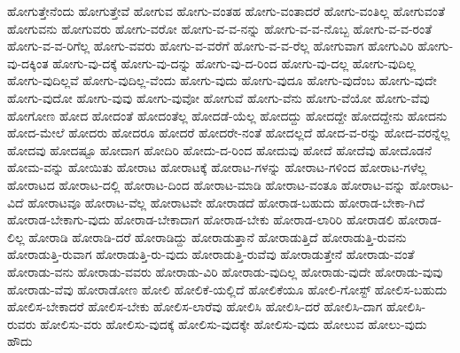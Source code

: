 {ಹೋಗುತ್ತೇನೆಂದು
ಹೋಗುತ್ತೇವೆ
ಹೋಗುವ
ಹೋಗು-ವಂತಹ
ಹೋಗು-ವಂತಾದರೆ
ಹೋಗು-ವಂತಿಲ್ಲ
ಹೋಗುವಂತೆ
ಹೋಗುವನು
ಹೋಗುವರು
ಹೋಗು-ವರೋ
ಹೋಗು-ವ-ವ-ನನ್ನು
ಹೋಗು-ವ-ವ-ನೊಬ್ಬ
ಹೋಗು-ವ-ವ-ರಂತೆ
ಹೋಗು-ವ-ವ-ರಿಗೆಲ್ಲ
ಹೋಗು-ವವರು
ಹೋಗು-ವ-ವರೆಗೆ
ಹೋಗು-ವ-ವ-ರೆಲ್ಲ
ಹೋಗುವಾಗ
ಹೋಗುವಿರಿ
ಹೋಗು-ವು-ದಕ್ಕಿಂತ
ಹೋಗು-ವು-ದಕ್ಕೆ
ಹೋಗು-ವು-ದನ್ನು
ಹೋಗು-ವು-ದ-ರಿಂದ
ಹೋಗು-ವು-ದಲ್ಲ
ಹೋಗು-ವುದಿಲ್ಲ
ಹೋಗು-ವುದಿಲ್ಲವೆ
ಹೋಗು-ವುದಿಲ್ಲ-ವೆಂದು
ಹೋಗು-ವುದು
ಹೋಗು-ವುದೂ
ಹೋಗು-ವುದೆಂಬ
ಹೋಗು-ವುದೇ
ಹೋಗು-ವುದೋ
ಹೋಗು-ವುವು
ಹೋಗು-ವುವೋ
ಹೋಗುವೆ
ಹೋಗು-ವೆನು
ಹೋಗು-ವೆಯೋ
ಹೋಗು-ವೆವು
ಹೋಗೋಣ
ಹೋದ
ಹೋದಂತೆ
ಹೋದಂತೆಲ್ಲ
ಹೋದಡೆ-ಯೆಲ್ಲ
ಹೋದದ್ದು
ಹೋದದ್ದೇ
ಹೋದದ್ದೇನು
ಹೋದನು
ಹೋದ-ಮೇಲೆ
ಹೋದರು
ಹೋದರೂ
ಹೋದರೆ
ಹೋದರೇ-ನಂತೆ
ಹೋದಲ್ಲದೆ
ಹೋದ-ವ-ರನ್ನು
ಹೋದ-ವರನ್ನೆಲ್ಲ
ಹೋದವು
ಹೋದಷ್ಟೂ
ಹೋದಾಗ
ಹೋದಿರಿ
ಹೋದು-ದ-ರಿಂದ
ಹೋದುವು
ಹೋದೆ
ಹೋದೆವು
ಹೋದೊಡನೆ
ಹೋಮ-ವನ್ನು
ಹೋಯಿತು
ಹೋರಾಟ
ಹೋರಾಟಕ್ಕೆ
ಹೋರಾಟ-ಗಳನ್ನು
ಹೋರಾಟ-ಗಳಿಂದ
ಹೋರಾಟ-ಗಳೆಲ್ಲ
ಹೋರಾಟದ
ಹೋರಾಟ-ದಲ್ಲಿ
ಹೋರಾಟ-ದಿಂದ
ಹೋರಾಟ-ಮಾಡಿ
ಹೋರಾಟ-ವಂತೂ
ಹೋರಾಟ-ವನ್ನು
ಹೋರಾಟ-ವಿದೆ
ಹೋರಾಟವೂ
ಹೋರಾಟ-ವೆಲ್ಲ
ಹೋರಾಟವೇ
ಹೋರಾಡದೆ
ಹೋರಾಡ-ಬಹುದು
ಹೋರಾಡ-ಬೇಕಾ-ಗಿದೆ
ಹೋರಾಡ-ಬೇಕಾಗು-ವುದು
ಹೋರಾಡ-ಬೇಕಾದಾಗ
ಹೋರಾಡ-ಬೇಕು
ಹೋರಾಡ-ಲಾರಿರಿ
ಹೋರಾಡಲಿ
ಹೋರಾಡ-ಲಿಲ್ಲ
ಹೋರಾಡಿ
ಹೋರಾಡಿ-ದರೆ
ಹೋರಾಡಿದ್ದು
ಹೋರಾಡುತ್ತಾನೆ
ಹೋರಾಡುತ್ತಿದೆ
ಹೋರಾಡುತ್ತಿ-ರುವನು
ಹೋರಾಡುತ್ತಿ-ರುವಾಗ
ಹೋರಾಡುತ್ತಿ-ರು-ವುದು
ಹೋರಾಡುತ್ತಿ-ರುವೆವು
ಹೋರಾಡುತ್ತೇನೆ
ಹೋರಾಡು-ವಂತೆ
ಹೋರಾಡು-ವನು
ಹೋರಾಡು-ವವರು
ಹೋರಾಡು-ವಿರಿ
ಹೋರಾಡು-ವುದಿಲ್ಲ
ಹೋರಾಡು-ವುದೇ
ಹೋರಾಡು-ವುವು
ಹೋರಾಡು-ವೆವು
ಹೋರಾಡೋಣ
ಹೋಲಿ
ಹೋಲಿಕೆ-ಯಲ್ಲಿದೆ
ಹೋಲಿಕೆಯೂ
ಹೋಲಿ-ಗೋಸ್ಟ್
ಹೋಲಿಸ-ಬಹುದು
ಹೋಲಿಸ-ಬೇಕಾದರೆ
ಹೋಲಿಸ-ಬೇಕು
ಹೋಲಿಸ-ಲಾರೆವು
ಹೋಲಿಸಿ
ಹೋಲಿಸಿ-ದರೆ
ಹೋಲಿಸಿ-ದಾಗ
ಹೋಲಿಸಿ-ರುವರು
ಹೋಲಿಸು-ವರು
ಹೋಲಿಸು-ವುದಕ್ಕೆ
ಹೋಲಿಸು-ವುದಕ್ಕೇ
ಹೋಲಿಸು-ವುದು
ಹೋಲುವ
ಹೋಲು-ವುದು
ಹೌದು
}
